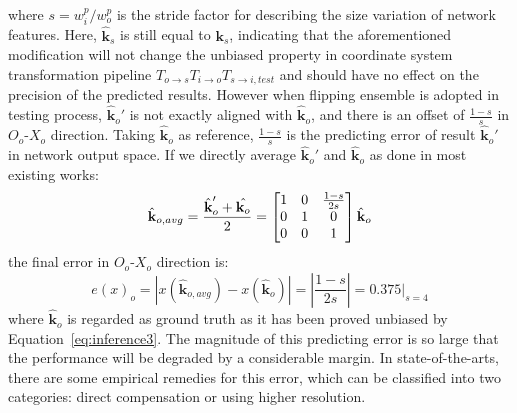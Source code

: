 \documentclass[10pt,journal,compsoc]{IEEEtran}
\begin{document}
where $s = w_i^p/w_o^p$ is the stride factor for describing the size variation of network features. Here, $\hat{\textbf{k}}_s$ is still equal to $\textbf{k}_s$, indicating that the aforementioned modification will not change the unbiased property in coordinate system transformation pipeline $T_{o\rightarrow s}T_{i\rightarrow o}T_{s\rightarrow i, test}$ and should have no effect on the precision of the predicted results. However when flipping ensemble is adopted in testing process, $\hat{\textbf{k}}_{o}'$ is not exactly aligned with $\hat{\textbf{k}}_o$, and there is an offset of $\frac{1-s}{s}$ in $O_o\text{-}X_o$ direction. Taking $\hat{\textbf{k}}_o$ as reference, $\frac{1-s}{s}$ is the predicting error of result $\hat{\textbf{k}}_{o}'$ in network output space. If we directly average $\hat{\textbf{k}}_{o}'$ and $\hat{\textbf{k}}_o$ as done in most existing works:
\begin{equation}
    \hat{\textbf{k}}_{o,avg} = \frac{\hat{\textbf{k}}_{o}' +\hat{\textbf{k}_o}}{2} = \begin{bmatrix} 1 & 0 & \frac{1-s}{2s} \\
                                                                                        0 & 1 & 0 \\
                                                                                        0 & 0 &1 \end{bmatrix}\hat{\textbf{k}}_o\\
\end{equation}
the final error in $O_o\text{-}X_o$ direction is:
\begin{equation}
    \label{eq:errornoshift}
    e(x)_o=|x(\hat{\textbf{k}}_{o,avg}) - x(\hat{\textbf{k}}_o)| = |\frac{1-s}{2s}|=0.375|_{s=4}
\end{equation}
where $\hat{\textbf{k}}_o$ is regarded as ground truth as it has been proved unbiased by Equation~\ref{eq:inference3}. The magnitude of this predicting error is so large that the performance will be degraded by a considerable margin. In state-of-the-arts, there are some empirical remedies for this error, which can be classified into two categories: direct compensation or using higher resolution.
\end{document}
